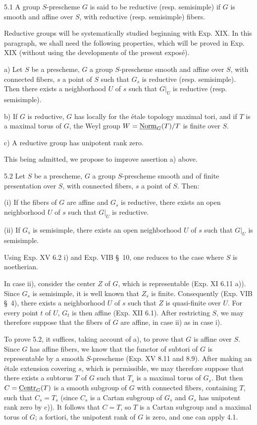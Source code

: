 \begin{definition}{5.1}\label{XVI.5.1}
A group $S$-prescheme $G$ is said to be reductive (resp. semisimple) if $G$ is smooth and affine over $S$, with reductive (resp. semisimple) fibers.
\end{definition}
\label{XVI.5.1.1}
Reductive groups will be systematically studied beginning with Exp. XIX. In this paragraph, we shall need the following properties, which will be proved in Exp. XIX (without using the developments of the present exposé).

\noindent a) Let $S$ be a prescheme, $G$ a group $S$-prescheme smooth and affine over $S$, with connected fibers, $s$ a point of $S$ such that $G_s$ is reductive (resp. semisimple). Then there exists a neighborhood $U$ of $s$ such that $G|_U$ is reductive (resp. semisimple).

\noindent b) If $G$ is reductive, $G$ has locally for the étale topology maximal tori, and if $T$ is a maximal torus of $G$, the Weyl group $W=\underline{\mathrm{Norm}}_G(T)/T$ is finite over $S$.

\noindent c) A reductive group has unipotent rank zero.

This being admitted, we propose to improve assertion a) above.
\begin{theorem}{5.2}\label{XVI.5.2}
Let $S$ be a prescheme, $G$ a group $S$-prescheme smooth and of finite presentation over $S$, with connected fibers, $s$ a point of $S$. Then:

\noindent (i) If the fibers of $G$ are affine and $G_s$ is reductive, there exists an open neighborhood $U$ of $s$ such that $G|_U$ is reductive.

\noindent (ii) If $G_s$ is semisimple, there exists an open neighborhood $U$ of $s$ such that $G|_U$ is semisimple.
\end{theorem}
Using Exp. XV 6.2 i) and Exp. VIB \S\ 10, one reduces to the case where $S$ is noetherian.

In case ii), consider the center $Z$ of $G$, which is representable (Exp. XI 6.11 a)). Since $G_s$ is semisimple, it is well known that $Z_s$ is finite. Consequently (Exp. VIB \S\ 4), there exists a neighborhood $U$ of $s$ such that $Z$ is quasi-finite over $U$. For every point $t$ of $U$, $G_t$ is then affine (Exp. XII 6.1). After restricting $S$, we may therefore suppose that the fibers of $G$ are affine, in case ii) as in case i).

To prove 5.2, it suffices, taking account of a), to prove that $G$ is affine over $S$. Since $G$ has affine fibers, we know that the functor of subtori of $G$ is representable by a smooth $S$-prescheme (Exp. XV 8.11 and 8.9). After making an étale extension covering $s$, which is permissible, we may therefore suppose that there exists a subtorus $T$ of $G$ such that $T_s$ is a maximal torus of $G_s$. But then $C=\underline{\mathrm{Centr}}_G(T)$ is a smooth subgroup of $G$ with connected fibers, containing $T$, such that $C_s=T_s$ (since $C_s$ is a Cartan subgroup of $G_s$ and $G_s$ has unipotent rank zero by c)). It follows that $C=T$, so $T$ is a Cartan subgroup and a maximal torus of $G$; a fortiori, the unipotent rank of $G$ is zero, and one can apply 4.1.

